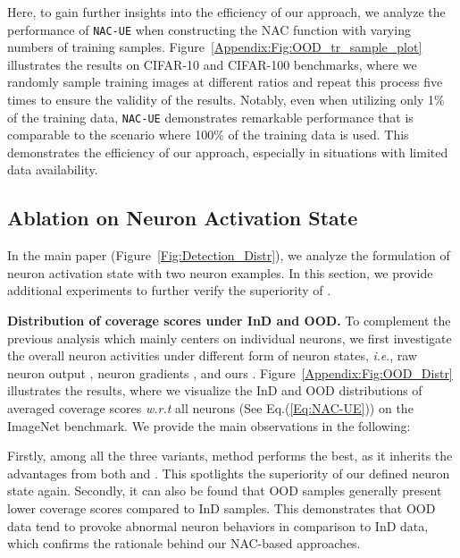 \documentclass{article} \usepackage{iclr2024_conference,times}
\newcommand{\ie}{\textit{i}.\textit{e}.}
\newcommand{\bfstart}[1]{\noindent\textbf{#1.}}
\begin{document}
Here, to gain further insights into the efficiency of our approach,  we analyze the performance of \texttt{NAC-UE} when constructing the NAC function with varying numbers of training samples. Figure~\ref{Appendix:Fig:OOD_tr_sample_plot} illustrates the results on CIFAR-10 and CIFAR-100 benchmarks, where we randomly sample training images at different ratios and repeat this process five times to ensure the validity of the results.
Notably, even when utilizing only 1\% of the training data, \texttt{NAC-UE} demonstrates remarkable performance that is comparable to the scenario where 100\% of the training data is used. This demonstrates the efficiency of our approach, especially in situations with limited data availability.








\subsection{Ablation on Neuron Activation State }
\label{Appendix:Ablation_NeuronState}
In the main paper (Figure~\ref{Fig:Detection_Distr}), we analyze the formulation of neuron activation state  with two neuron examples. In this section, we provide additional experiments to further verify the superiority of .


\bfstart{Distribution of coverage scores under InD and OOD}
To complement the previous analysis which mainly centers on individual neurons, we first investigate the overall neuron activities under different form of neuron states, \ie, raw neuron output , neuron gradients , and ours .
Figure~\ref{Appendix:Fig:OOD_Distr} illustrates the results, where we visualize the InD and OOD distributions of averaged coverage scores \textit{w.r.t} all neurons (See Eq.(\ref{Eq:NAC-UE})) on the ImageNet benchmark. 
We provide the main observations in the following:







Firstly, among all the three variants,  method performs the best, as it inherits the advantages from both  and . This spotlights the superiority of our defined neuron state again. 
Secondly, it can also be found that OOD samples generally present lower coverage scores compared to InD samples. This demonstrates that OOD data tend to provoke abnormal neuron behaviors in comparison to InD data, which confirms the rationale behind our NAC-based approaches.
\end{document}
